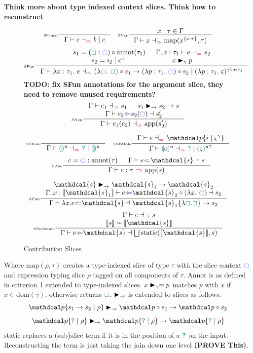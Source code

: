 \textbf{Think more about type indexed context slices. Think how to reconstruct }
\newcommand{\s}{\mathdcal{s}}
\begin{figure}[h]
\[\inference[\tiny SConst]{}{\synthesissliceindexed{c}{b\mid c}} \quad
\inference[\tiny SVar]{x : \tau \in \Gamma}{\synthesissliceindexed{x}{\mathrm{map}{(x^{\{x:\tau\}}, \tau)}}}\]
\[ 
\inference[\tiny SFun]{s_1 = (\gap : \cmark)\circ \mathrm{annot}(\tau_1) &\synthesissliceindexed[\Gamma,x:\tau_1]{e}{s_2}\\ s_2 = i_2 \mid \varsigma^\gamma & x \match{\gamma} p}{\synthesissliceindexed{\lambda x:\tau_1.\ e}{(\lambda \cmark.\ \gap) \circ s_1 \to (\lambda p : \tau_1.\ \cmark) \circ s_2 \mid (\lambda p : \tau_1.\ \varsigma)^{\gamma\backslash x:\tau_1}}}\]
\textbf{TODO: fix SFun annotations for the argument slice, they need to remove unused requirements?}
\[\inference[\tiny SApp]{\synthesissliceindexed{e_1}{s_1} & s_1 \funmatch s_2 \to s \\ \analysissliceindexed{e_2}{s_2(\cmark)}{s_2'}}{\synthesissliceindexed{e_1(e_2)}{\text{app}(s_2')}}\]
 
\[\inference[\tiny SEHole]{}{\synthesissliceindexed{\hole^u}{\dyn \mid \hole^u}} \quad \inference[\tiny SNEHole]{\synthesissliceindexed{e}{\p\{i \mid \varsigma^\gamma\}}}{\synthesissliceindexed{\hole[e]^u}{\dyn \mid {\hole[\varsigma]^u}^\gamma}}\]
\[\quad 
\inference[\tiny SAsc]{c = \cmark : \text{annot}(\tau) & \analysissliceindexed{e}{\s}{s}}{\synthesis{e : \tau}{\mathrm{app}(s)}}\]

\[\inference[\tiny AFun]{\s \funmatch \s_1 \to \s_2\\ \analysissliceindexed[\Gamma, x:\type{\s_1}]{e}{\s_2 \circ (\lambda x.\ \cmark)}{s_2}}{\analysissliceindexed{\lambda x.e}{\s}{\s_1\{\lambda \gap. \gap\} \to s_2}}\] 
\[\inference[\tiny ASubsume]{\synthesissliceindexed{e}{s}\\ \type{s} \sim \type{\s}}{\analysissliceindexed{e}{\s}{\bigsqcup\mathrm{static}(\type{\s}, s)}}\]
\caption{Contribution Slices}
\label{fig:ContributionSliceRules}
\end{figure} 

Where $\mathrm{map}(\rho, \tau)$ creates a type-indexed slice of type $\tau$ with the slice context $\cmark$ and expression typing slice $\rho$ tagged on all components of $\tau$. Annot is as defined in criterion 1 extended to type-indexed slices. $x \blacktriangleright_{\gamma} = p$ matches $p$ with $x$ if $x \in \text{dom}(\gamma)$, otherwise returns ${\color{teal}\Box}$. $\blacktriangleright_\rightarrow$ is extended to slices as follows:
\[\p\{s_1 \to s_2 \mid \rho\} \funmatch \p\circ s_1 \to \p \circ s_2\]
\[\p\{\dyn \mid \rho\} \funmatch \p\{\dyn \mid \rho\} \to \p\{\dyn \mid \rho\}\]
static replaces a (sub)slice term if it is in the position of a ${\color{teal}\texttt{?}}$ on the input. Reconstructing the term is just taking the join down one level \textbf{(PROVE This)}. 

